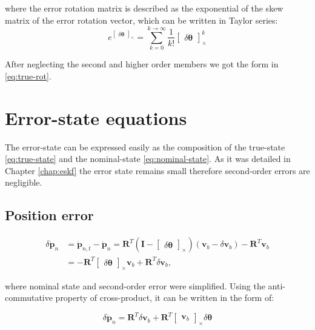 where the error rotation matrix is described as the exponential of the skew matrix of the error rotation vector, which can be written in Taylor series:
\begin{equation}
    e^{\begin{bmatrix}\delta\boldsymbol{\theta} \end{bmatrix}_\times} = \sum_{k=0}^{k\rightarrow\infty}\frac{1}{k!}\begin{bmatrix}\delta\boldsymbol{\theta}\end{bmatrix}_\times^k
\end{equation}

After neglecting the second and higher order members we got the form in \eqref{eq:true-rot}.

\section{Error-state equations}
\label{app:eskf-eqs}

The error-state can be expressed easily as the composition of the true-state \eqref{eq:true-state} and the nominal-state \eqref{eq:nominal-state}. As it was detailed in Chapter \ref{chap:eskf} the error state remains small therefore second-order errors are negligible.

\subsection{Position error}

\begin{equation}
\begin{aligned}
    \delta\dot{\mathbf{p}}_n&=\mathbf{\dot{p}}_{n,t}-\mathbf{\dot{p}}_n=\mathbf{R}^T\left(\mathbf{I} -\begin{bmatrix} \delta\boldsymbol{\theta} \end{bmatrix}_\times\right) (\mathbf{v}_b-\delta\mathbf{v}_b)-\mathbf{R}^T\mathbf{v}_b \\
    &= -\mathbf{R}^T\begin{bmatrix} \delta\boldsymbol{\theta} \end{bmatrix}_\times\mathbf{v}_b+ \mathbf{R}^T\delta\mathbf{v}_b, 
\end{aligned}
\end{equation}

where nominal state and second-order error were simplified. Using the anti-commutative property of cross-product, it can be written in the form of:

\begin{tcolorbox}
\begin{equation}
    \delta\dot{\mathbf{p}}_n=\mathbf{R}^T\delta\mathbf{v}_b+\mathbf{R}^T\begin{bmatrix} \mathbf{v}_b \end{bmatrix}_\times \delta\boldsymbol{\theta}
\end{equation}
\end{tcolorbox}

